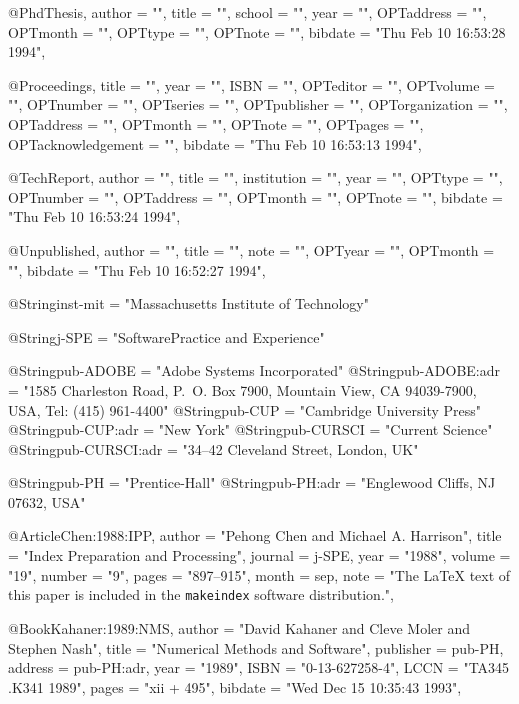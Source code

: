@PhdThesis{,
  author =       "",
  title =        "",
  school =       "",
  year =         "",
  OPTaddress =   "",
  OPTmonth =     "",
  OPTtype =      "",
  OPTnote =      "",
  bibdate =      "Thu Feb 10 16:53:28 1994",
}

@Proceedings{,
  title =        "",
  year =         "",
  ISBN =         "",
  OPTeditor =    "",
  OPTvolume =    "",
  OPTnumber =    "",
  OPTseries =    "",
  OPTpublisher = "",
  OPTorganization = "",
  OPTaddress =   "",
  OPTmonth =     "",
  OPTnote =      "",
  OPTpages =     "",
  OPTacknowledgement = "",
  bibdate =      "Thu Feb 10 16:53:13 1994",
}

@TechReport{,
  author =       "",
  title =        "",
  institution =  "",
  year =         "",
  OPTtype =      "",
  OPTnumber =    "",
  OPTaddress =   "",
  OPTmonth =     "",
  OPTnote =      "",
  bibdate =      "Thu Feb 10 16:53:24 1994",
}

@Unpublished{,
  author =       "",
  title =        "",
  note =         "",
  OPTyear =      "",
  OPTmonth =     "",
  bibdate =      "Thu Feb 10 16:52:27 1994",
}

@String{inst-mit        = "Massachusetts Institute of Technology"}

@String{j-SPE           = "Soft{\-}ware\emdash Prac{\-}tice and Experience"}

@String{pub-ADOBE       = "{Adobe Systems Incorporated}"}
@String{pub-ADOBE:adr   = "1585 Charleston Road, P.~O. Box 7900, Mountain
                           View, CA 94039-7900, USA, Tel: (415) 961-4400"}
@String{pub-CUP         = "Cambridge University Press"}
@String{pub-CUP:adr     = "New York"}
@String{pub-CURSCI        = "Current Science"}
@String{pub-CURSCI:adr    = "34--42 Cleveland Street, London, UK"}

@String{pub-PH          = "Pren{\-}tice-Hall"}
@String{pub-PH:adr      = "Englewood Cliffs, NJ 07632, USA"}

@Article{Chen:1988:IPP,
  author =       "Pehong Chen and Michael A. Harrison",
  title =        "Index Preparation and Processing",
  journal =      j-SPE,
  year =         "1988",
  volume =       "19",
  number =       "9",
  pages =        "897--915",
  month =        sep,
  note =         "The {\LaTeX} text of this paper is included in the
                 {\tt makeindex} software distribution.",
}

@Book{Kahaner:1989:NMS,
  author =       "David Kahaner and Cleve Moler and Stephen Nash",
  title =        "Numerical Methods and Software",
  publisher =    pub-PH,
  address =      pub-PH:adr,
  year =         "1989",
  ISBN =         "0-13-627258-4",
  LCCN =         "TA345 .K341 1989",
  pages =        "xii + 495",
  bibdate =      "Wed Dec 15 10:35:43 1993",
}

